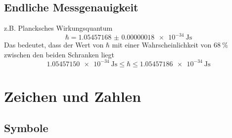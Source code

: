 \documentclass[11pt]{article}
\begin{document}
\subsection{Endliche Messgenauigkeit}
\label{sec-1-5}
z.B. Plancksches Wirkungsquantum
\[\si{\planckbar} = \SI{1.05457168(18)e-34}{\joule\second}\]
Das bedeutet, dass der Wert von $\si{\planckbar}$ mit einer Wahrscheinlichkeit von $\SI{68}{\percent}$ zwischen den beiden Schranken liegt \[\SI{1.05457150e-34}{\joule\second} \leq \si{\planckbar} \leq \SI{1.05457186e-34}{\joule\second}\]

\section{Zeichen und Zahlen}
\label{sec-2}
\subsection{Symbole}
\label{sec-2-1}
\end{document}
